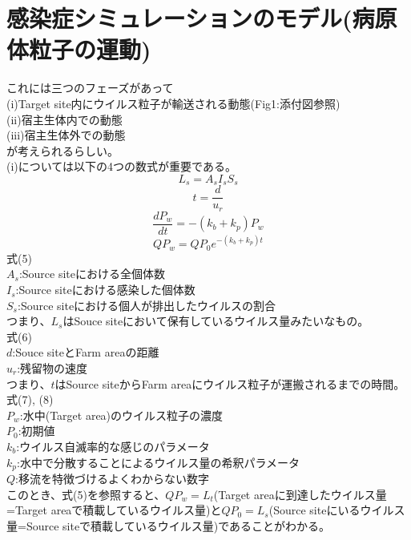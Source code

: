 \documentclass{article}
\begin{document}
\section{感染症シミュレーションのモデル(病原体粒子の運動)}
これには三つのフェーズがあって\\
(i)Target site内にウイルス粒子が輸送される動態(Fig1:添付図参照)\\
(ii)宿主生体内での動態\\
(iii)宿主生体外での動態\\
が考えられるらしい。\\
(i)については以下の4つの数式が重要である。\\
\begin{equation}
    L_s = A_sI_sS_s
\end{equation}
\begin{equation}
    t = \frac{d}{u_r}
\end{equation}
\begin{equation}
    \frac{dP_w}{dt} = -(k_b+k_p)P_w
\end{equation}
\begin{equation}
    QP_w = QP_0e^{-(k_b+k_p)t}
\end{equation}
式(5)\\
$A_s$:Source siteにおける全個体数\\
$I_s$:Source siteにおける感染した個体数\\
$S_s$:Source siteにおける個人が排出したウイルスの割合\\
つまり、$L_s$はSouce siteにおいて保有しているウイルス量みたいなもの。\\
式(6)\\
$d$:Souce siteとFarm areaの距離\\
$u_r$:残留物の速度\\
つまり、$t$はSource siteからFarm areaにウイルス粒子が運搬されるまでの時間。\\
式(7), (8)\\
$P_w$:水中(Target area)のウイルス粒子の濃度\\
$P_0$:初期値\\
$k_b$:ウイルス自滅率的な感じのパラメータ\\
$k_p$:水中で分散することによるウイルス量の希釈パラメータ\\
$Q$:移流を特徴づけるよくわからない数字\\
このとき、式(5)を参照すると、$QP_w = L_t$(Target areaに到達したウイルス量=Target areaで積載しているウイルス量)と$QP_0 = L_s$(Source siteにいるウイルス量=Source siteで積載しているウイルス量)であることがわかる。
\end{document}
